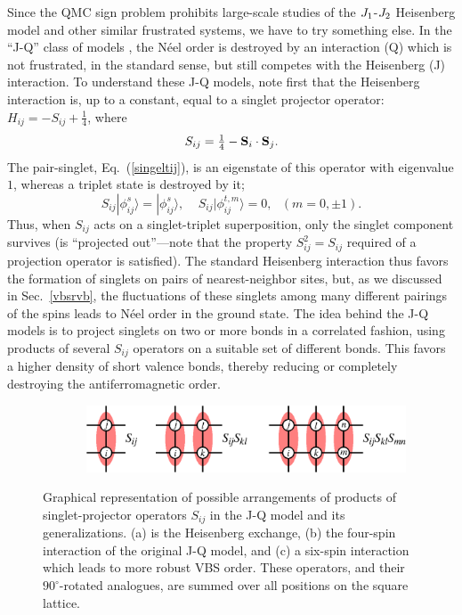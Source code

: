 \documentclass[draft,numberedheadings]{aipproc}
\begin{document}
Since the QMC sign problem prohibits large-scale studies of the $J_{\rm 1}$-$J_{\rm 2}$ Heisenberg model and other similar frustrated systems, we have to try 
something else. In the ``J-Q'' class of models \cite{sandvik1,lou1,arnab}, the N\'eel order is destroyed by an interaction (Q) which is not frustrated, in the 
standard sense, but still competes with the Heisenberg (J) interaction. To understand these J-Q models, note first that the Heisenberg interaction is, up to a 
constant, equal to a singlet projector operator: $H_{ij}=-S_{ij}+ \frac{1}{4}$, where
\begin{equation}
S_{ij} = \hbox{$\frac{1}{4}$} - {\bf S}_i \cdot {\bf S}_j.
\label{singproj}
\end{equation}
The pair-singlet, Eq.~(\ref{singeltij}), is an eigenstate of this operator with eigenvalue $1$, whereas a triplet state is destroyed by it;
\begin{equation}
S_{ij}|\phi^s_{ij}\rangle=|\phi^s_{ij}\rangle,~~~~~S_{ij}|\phi^{t,m}_{ij}\rangle=0,~~~ (m=0,\pm 1).
\end{equation}
Thus, when $S_{ij}$ acts on a singlet-triplet superposition, only the singlet component survives (is ``projected out''---note that the property 
$S_{ij}^2=S_{ij}$ required of a projection operator is satisfied). The standard Heisenberg interaction thus favors the formation of singlets on pairs of 
nearest-neighbor sites, but, as we discussed in Sec.~\ref{vbsrvb}, the fluctuations of these singlets among many different pairings of the spins leads to 
N\'eel order in the ground state. The idea behind the J-Q models is to project singlets on two or more bonds in a correlated fashion, using products of 
several $S_{ij}$ operators on a suitable set of different bonds. This favors a higher density of short valence bonds, thereby reducing or completely 
destroying the antiferromagnetic order.

\begin{figure}
~~~~~~~\includegraphics[width=9.5cm, clip]{jqops.eps}
\caption{Graphical representation of possible arrangements of products of singlet-projector operators $S_{ij}$ in the J-Q model and its generalizations. 
(a) is the Heisenberg exchange, (b) the four-spin interaction of the original J-Q model, and (c) a six-spin interaction which leads to more robust VBS
order. These operators, and their $90^\circ$-rotated analogues, are summed over all positions on the square lattice.}
\label{jqops}
\end{figure}
\end{document}
